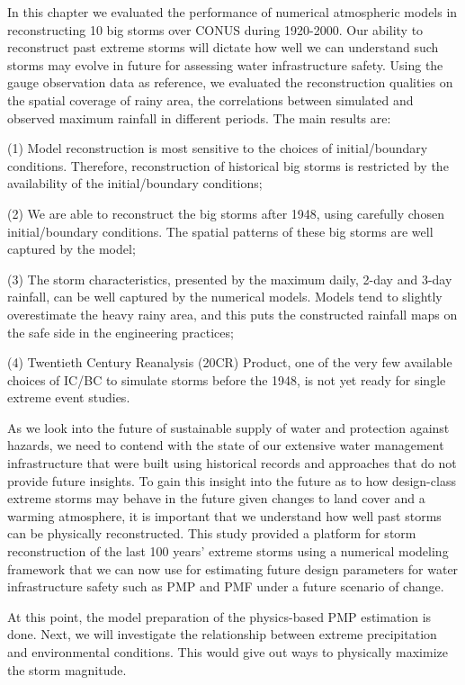 In this chapter we evaluated the performance of numerical atmospheric models in reconstructing 10 big storms over CONUS during 1920-2000. Our ability to reconstruct past extreme storms will dictate how well we can understand such storms may evolve in future for assessing water infrastructure safety. Using the gauge observation data as reference, we evaluated the reconstruction qualities on the spatial coverage of rainy area, the correlations between simulated and observed maximum rainfall in different periods. The main results are:

(1) Model reconstruction is most sensitive to the choices of initial/boundary conditions. Therefore, reconstruction of historical big storms is restricted by the availability of the initial/boundary conditions;

(2) We are able to reconstruct the big storms after 1948, using carefully chosen initial/boundary conditions. The spatial patterns of these big storms are well captured by the model;

(3) The storm characteristics, presented by the maximum daily, 2-day and 3-day rainfall, can be well captured by the numerical models. Models tend to slightly overestimate the heavy rainy area, and this puts the constructed rainfall maps on the safe side in the engineering practices;

(4) Twentieth Century Reanalysis (20CR) Product, one of the very few available choices of IC/BC to simulate storms before the 1948, is not yet ready for single extreme event studies. 

As we look into the future of sustainable supply of water and protection against hazards, we need to contend with the state of our extensive water management infrastructure that were built using historical records and approaches that do not provide future insights. To gain this insight into the future as to how design-class extreme storms may behave in the future given changes to land cover and a warming atmosphere, it is important that we understand how well past storms can be physically reconstructed. This study provided a platform for storm reconstruction of the last 100 years’ extreme storms using a numerical modeling framework that we can now use for estimating future design parameters for water infrastructure safety such as PMP and PMF under a future scenario of change.

At this point, the model preparation of the physics-based PMP estimation is done. Next, we will investigate the relationship between extreme precipitation and environmental conditions. This would give out ways to physically maximize the storm magnitude.


